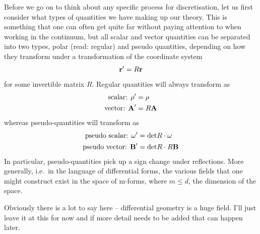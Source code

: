 \documentclass[11pt, oneside]{article} %
\numberwithin{equation}{section}
\begin{document}
Before we go on to think about any specific process for discretisation, let us first consider what types of quantities we have making up our theory. This is something that one can often get quite far without paying attention to when working in the continuum, but all scalar and vector quantities can be separated into two types, polar (read: regular) and pseudo quantities, depending on how they transform under a transformation of the coordinate system
\begin{align}
    \textbf r' = R\textbf r
\end{align}
for some invertible matrix $R$. Regular quantities will always transform as
\begin{align}
    \textup{scalar: }\rho' &= \rho \\ 
    \textup{vector: } \textbf A' &=R \textbf  A
\end{align}
whereas pseudo-quantities will transform as
\begin{align}
    \textup{pseudo scalar: }\omega' &= \textup{det}R \cdot \omega \\ 
    \textup{pseudo vector: } \textbf B' &=\textup{det}R \cdot R\textbf  B
\end{align}
In particular, pseudo-quantities pick up a sign change under reflections. More generally, i.e.~in the language of differential forms, the various fields that one might construct exist in the space of m-forms, where $m \leq d$, the dimension of the space. 
\begin{shaded}
    Obviously there is a lot to say here -- differential geometry is a huge field. I'll just leave it at this for now and if more detail needs to be added that can happen later.
\end{shaded}
\end{document}
